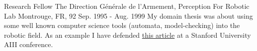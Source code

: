 \begin{cventries}
  \cventry
    {Research Fellow} %
    {The Direction Générale de l'Armement, Perception For Robotic Lab} %
    {Montrouge, FR, 92} %
    {Sep. 1995 - Aug. 1999} %
    {My domain thesis was about using some well known computer science tools (automata, model-checking) into the robotic field. As an example I have defended \href{http://www.aaai.org/Papers/Symposia/Spring/1999/SS-99-05/SS99-05-001.pdf}{this article} at a Stanford University AIII conference.}
    {
      \begin{cvitems} %
        \item {}
      \end{cvitems}
    }

\end{cventries}
